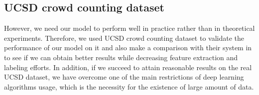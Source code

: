 \subsection{UCSD crowd counting dataset}

However, we need our model to perform well in practice rather than in theoretical experiments. Therefore, we used UCSD crowd counting dataset \cite{chan2008privacy} to validate the performance of our model on it and also make a comparison with their system in \cite{chan2008privacy} to see if we can obtain better results while decreasing feature extraction and labeling efforts. In addition, if we succeed to attain reasonable results on the real UCSD dataset, we have overcome one of the main restrictions of deep learning algorithms usage, which is the necessity for the existence of large amount of data.     




